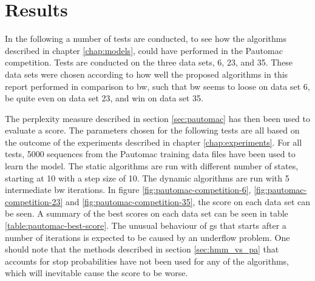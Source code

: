 \chapter{Results}\label{chap:results}
In the following a number of tests are conducted, to see how the algorithms described in chapter \ref{chap:models}, could have performed in the Pautomac competition. Tests are conducted on the three data sets, 6, 23, and 35. These data sets were chosen according to how well the proposed algorithms in this report performed in comparison to \gls{bw}, such that \gls{bw} seems to loose on data set 6, be quite even on data set 23, and win on data set 35.

The perplexity measure described in section \ref{sec:pautomac} has then been used to evaluate a score.
The parameters chosen for the following tests are all based on the outcome of the experiments described in chapter \ref{chap:experiments}.
For all tests, 5000 sequences from the Pautomac training data files have been used to learn the model. The static algorithms are run with different number of states, starting at 10 with a step size of 10.
The dynamic algorithms are run with 5 intermediate \gls{bw} iterations.
In figure \ref{fig:pautomac-competition-6}, \ref{fig:pautomac-competition-23} and \ref{fig:pautomac-competition-35}, the score on each data set can be seen.
A summary of the best scores on each data set can be seen in table \ref{table:pautomac-best-score}.
The unusual behaviour of \gls{gs} that starts after a number of iterations is expected to be caused by an underflow problem.
One should note that the methods described in section \ref{sec:hmm_vs_pa} that accounts for stop probabilities have not been used for any of the algorithms, which will inevitable cause the score to be worse.


